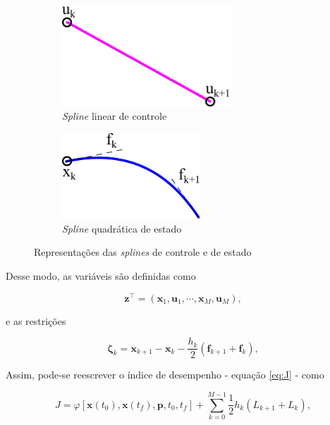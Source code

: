 \begin{figure}[H]
    \centering
    \begin{subfigure}{0.48\linewidth}
        \centering
        \includegraphics[width=0.7\textwidth]{Cap2/linear-spline.pdf}
        \caption{\textit{Spline} linear de controle}
    \end{subfigure}
    \hfill
    \begin{subfigure}{0.48\linewidth}
        \centering
        \includegraphics[width=0.57\textwidth]{Cap2/quadratic-spline.pdf}
        \caption{\textit{Spline} quadrática de estado}
    \end{subfigure}
    \caption{Representações das \textit{splines} de controle e de estado}
    \label{fig:splines}
\end{figure}

Desse modo, as variáveis são definidas como

\begin{equation}
    \mathbf{z}^\intercal = \left( \mathbf{x}_1, \mathbf{u}_1, \cdots, \mathbf{x}_M, \mathbf{u}_M \right),
    \label{eq:z}
\end{equation}

\noindent e as restrições

\begin{equation}
    \boldsymbol{\zeta}_k = \mathbf{x}_{k+1} - \mathbf{x}_k - \dfrac{h_k}{2} \left( \mathbf{f}_{k+1} + \mathbf{f}_k \right),
    \label{eq:defects}
\end{equation}

Assim, pode-se reescrever o índice de desempenho - equação \ref{eq:J} - como

\begin{equation}
    J = \varphi \left[ \mathbf{x} \left( t_0 \right), \mathbf{x} \left( t_f \right), \mathbf{p}, t_0, t_f \right]
    + \sum_{k=0}^{M-1} \dfrac{1}{2} h_k \left( L_{k+1} + L_k \right),
    \label{eq:J-trapezoidal}
\end{equation}


